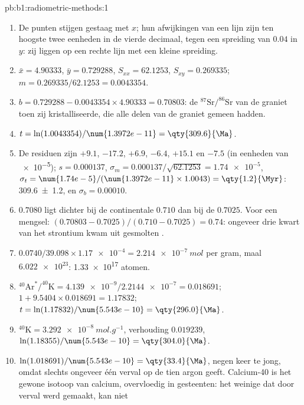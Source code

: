 \begin{solution}{pb:b1:radiometric-methods:1}
\begin{enumerate}
  \item De punten stijgen gestaag met $x$; hun afwijkingen van een lijn zijn ten hoogste twee eenheden in de vierde decimaal, tegen een spreiding van $0.04$ in $y$:
        zij liggen op een rechte lijn met een kleine spreiding.
  \item $\bar x = 4.90333$, $\bar y = 0.729288$, $S_{xx} = 62.1253$, $S_{xy} =
        0.269335$; $m = 0.269335/62.1253 = 0.0043354$.
  \item $b = 0.729288 - 0.0043354 \times 4.90333 = 0.70803$: de
        $^{87}\mathrm{Sr}/^{86}\mathrm{Sr}$ van de graniet toen zij kristalliseerde, die alle delen van de graniet gemeen hadden.
  \item $t = \ln(1.0043354)/\num{1.3972e-11} = \qty{309.6}{\Ma}$.
  \item De residuen zijn $+9.1$, $-17.2$, $+6.9$, $-6.4$, $+15.1$ en $-7.5$ (in
        eenheden van \num{e-5}); $s = 0.000137$, $\sigma_m = 0.000137/\sqrt{62.1253} =
        \num{1.74e-5}$, $\sigma_t = \num{1.74e-5}/(\num{1.3972e-11} \times 1.0043)
        = \qty{1.2}{\Myr}$: \qty[uncertainty-mode=separate]{309.6(12)}{\Ma}, en
        $\sigma_b = 0.00010$.
  \item $0.7080$ ligt dichter bij de continentale  $0.710$ dan bij de  $0.7025$.
        Voor een mengsel: $(0.70803 - 0.7025)/(0.710 - 0.7025) = 0.74$: ongeveer drie
        kwart van het strontium kwam uit gesmolten .
  \item $0.0740/39.098 \times \num{1.17e-4} = \qty{2.214e-7}{mol}$ per gram,
        maal $\num{6.022e23}$: \num{1.33e17} atomen.
  \item $^{40}\mathrm{Ar}^*/^{40}\mathrm{K} = \num{4.139e-9}/\num{2.2144e-7} =
        0.018691$; $1 + 9.5404 \times 0.018691 = 1.17832$; $t =
        \ln(1.17832)/\num{5.543e-10} = \qty{296.0}{\Ma}$.
  \item $^{40}\mathrm{K} = \qty{3.292e-8}{mol.g^{-1}}$, verhouding $0.019239$,
        $\ln(1.18355)/\num{5.543e-10} = \qty{304.0}{\Ma}$.
  \item $\ln(1.018691)/\num{5.543e-10} = \qty{33.4}{\Ma}$, negen keer te jong,
        omdat slechts ongeveer één verval op de tien argon geeft. Calcium-40 is het gewone
        isotoop van calcium, overvloedig in gesteenten: het weinige dat door verval werd gemaakt, kan niet

\end{enumerate}
\end{solution}
